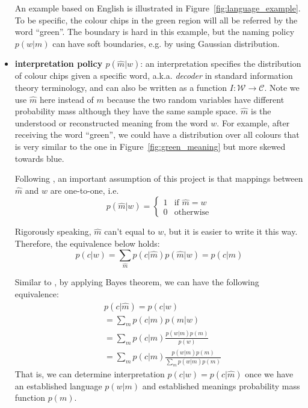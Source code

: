 \documentclass[11pt]{article}
\begin{document}
\begin{itemize}[leftmargin=*]
    An example based on English is illustrated in Figure~\ref{fig:language_example}.
    To be specific, the colour chips in the green region will all be referred by the word ``green''.
    The boundary is hard in this example, but the naming policy $p(w|m)$ can have soft boundaries, e.g. by using Gaussian distribution.
    
    \item \textbf{interpretation policy $p(\hat{m}|w)$\label{par:decoder}}: an interpretation specifies the distribution of colour chips given a specific word, a.k.a. \emph{decoder} in standard information theory terminology, and can also be written as a function $I:\mathcal{W}\rightarrow\mathcal{C}$.
    Note we use $\hat{m}$ here instead of $m$ because the two random variables have different probability mass although they have the same sample space. 
    $\hat{m}$ is the understood or reconstructed meaning from the word $w$.
    For example, after receiving the word ``green'', we could have a distribution over all colours that is very similar to the one in Figure~\ref{fig:green_meaning} but more skewed towards blue.
    
    Following \citet{zaslavsky2018efficient}, an important assumption of this project is that mappings between $\hat{m}$ and $w$ are one-to-one, i.e.
    \begin{equation}
        p(\hat{m}|w) =
        \begin{cases}
            1 & \text{if $\hat{m}=w$}\\
            0 & \text{otherwise}
        \end{cases} 
        \label{eq:bijective_mhat_w}
    \end{equation}
    
    Rigorously speaking, $\hat{m}$ can't equal to $w$, but it is easier to write it this way. Therefore, the equivalence below holds:
    \begin{equation}
        p(c|w)  = \sum_{\hat{m}} p(c|\hat{m})p(\hat{m}|w)  = p(c|\hat{m})
        \label{eq:p_mhat_and_m}
    \end{equation}
    
    Similar to \citep{zaslavsky2018efficient}, by applying Bayes theorem, we can have the following equivalence:
    \begin{equation}
        \begin{split}
            & p(c|\hat{m}) = p(c|w) \\
            & = \sum_m p(c|m)p(m|w) \\
            & = \sum_m p(c|m) \frac{p(w|m)p(m)}{p(w)} \\
            & = \sum_m p(c|m) \frac{p(w|m)p(m)}{\sum_m p(w|m)p(m)}
        \end{split}
        \label{eq:bayesian_interpretation}
    \end{equation}
    That is, we can determine interpretation $p(c|w) = p(c|\hat{m})$ once we have an established language $p(w|m)$ and established meanings probability mass function $p(m)$.
\end{itemize}
\end{document}
